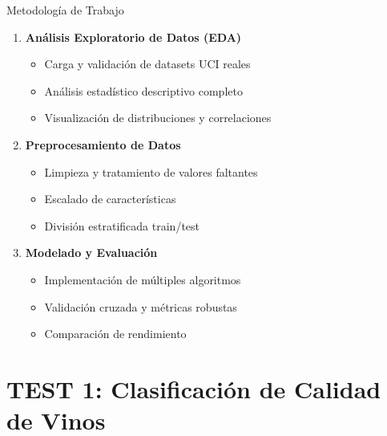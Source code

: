 \documentclass[aspectratio=169]{beamer}
\begin{document}
\begin{frame}{Metodología de Trabajo}
    \begin{enumerate}
        \item \textbf{Análisis Exploratorio de Datos (EDA)}
        \begin{itemize}
            \item Carga y validación de datasets UCI reales
            \item Análisis estadístico descriptivo completo
            \item Visualización de distribuciones y correlaciones
        \end{itemize}
        
        \item \textbf{Preprocesamiento de Datos}
        \begin{itemize}
            \item Limpieza y tratamiento de valores faltantes
            \item Escalado de características
            \item División estratificada train/test
        \end{itemize}
        
        \item \textbf{Modelado y Evaluación}
        \begin{itemize}
            \item Implementación de múltiples algoritmos
            \item Validación cruzada y métricas robustas
            \item Comparación de rendimiento
        \end{itemize}
    \end{enumerate}
\end{frame}

\section{TEST 1: Clasificación de Calidad de Vinos}
\end{document}
